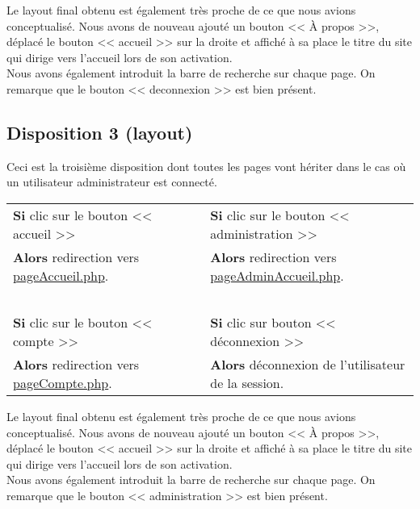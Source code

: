 
        \begin{paragraphe}
            Le layout final obtenu est également très proche de ce que nous avions conceptualisé. Nous avons de nouveau ajouté un bouton << À propos >>,
            déplacé le bouton << accueil >> sur la droite et affiché à sa place le titre du site qui dirige vers l'accueil lors de son activation.\\
            Nous avons également introduit la barre de recherche sur chaque page. On remarque que le bouton << deconnexion >> est bien présent.
        \end{paragraphe}


	\newpage

	\subsection{Disposition 3 (layout)}

		\begin{paragraphe}
            Ceci est la troisième disposition dont toutes les pages vont hériter dans le cas où un utilisateur administrateur est connecté.
		\end{paragraphe}

        \begin{center}
            \begin{tabular}{l c | c l}
                \textbf{Si} clic sur le bouton << accueil >> & & & \textbf{Si} clic sur le bouton << administration >> \\
                \textbf{Alors} redirection vers \underline{pageAccueil.php}. & & & \textbf{Alors} redirection vers \underline{pageAdminAccueil.php}. \\ \\
                \textbf{Si} clic sur le bouton << compte >> & & & \textbf{Si} clic sur bouton << déconnexion >> \\
                \textbf{Alors} redirection vers \underline{pageCompte.php}. & & & \textbf{Alors} déconnexion de l'utilisateur de la session.
            \end{tabular}
        \end{center}


        \begin{paragraphe}
            Le layout final obtenu est également très proche de ce que nous avions conceptualisé. Nous avons de nouveau ajouté un bouton << À propos >>,
            déplacé le bouton << accueil >> sur la droite et affiché à sa place le titre du site qui dirige vers l'accueil lors de son activation.\\
            Nous avons également introduit la barre de recherche sur chaque page. On remarque que le bouton << administration >> est bien présent.
        \end{paragraphe}

